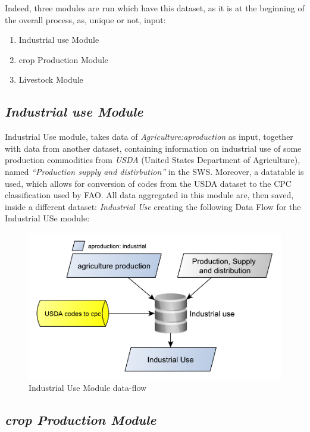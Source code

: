 \documentclass[]{article}
\providecommand{\tightlist}{%
  \setlength{\itemsep}{0pt}\setlength{\parskip}{0pt}}
\begin{document}
Indeed, three modules are run which have this dataset, as it is at the
beginning of the overall process, as, unique or not, input:

\begin{enumerate}
\def\labelenumi{\arabic{enumi}.}
\tightlist
\item
  Industrial use Module
\item
  crop Production Module
\item
  Livestock Module
\end{enumerate}

\subsection{\texorpdfstring{\emph{Industrial use
Module}}{Industrial use Module}}\label{industrial-use-module}

Industrial Use module, takes data of \emph{Agriculture:aproduction} as
input, together with data from another dataset, containing information
on industrial use of some production commodities from \emph{USDA}
(United States Department of Agriculture), named \emph{``Production
supply and distirbution''} in the SWS. Moreover, a datatable is used,
which allows for conversion of codes from the USDA dataset to the CPC
classification used by FAO. All data aggregated in this module are, then
saved, inside a different dataset: \emph{Industrial Use} creating the
following Data Flow for the Industrial USe module:

\begin{figure}[H]

{\centering \includegraphics[width=0.55\linewidth]{images/SwsFbs/05_industrialModule} 

}

\caption{\label{fig:f5}Industrial Use Module data-flow}\label{fig:f5}
\end{figure}

\subsection{\texorpdfstring{\emph{crop Production
Module}}{crop Production Module}}\label{crop-production-module}
\end{document}
